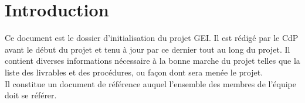 \section{Introduction}

Ce document est le dossier d'initialisation du projet GEI. Il est rédigé par le CdP avant le 
début du projet et tenu à jour par ce dernier tout au long du projet. Il
contient diverses informations nécessaire à la bonne marche du projet telles que
la liste des livrables et des procédures, ou façon dont sera menée le projet.\\
Il constitue un document de référence auquel l'ensemble des membres de
l'équipe doit se référer.
